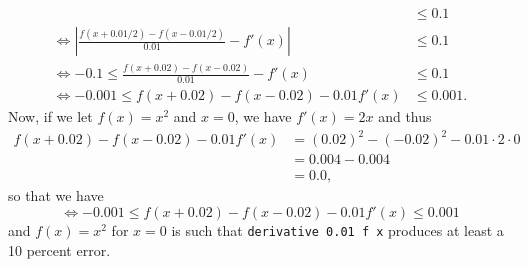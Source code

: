 \documentclass{article}
\begin{document}
\begin{itemize}
\begin{equation*}
\begin{split}
            &\leq 0.1 \\
            \Leftrightarrow \left| \frac{f(x + 0.01/2) - f(x - 0.01/2)}{0.01} - f'(x) \right| 
            &\leq 0.1 \\
            \Leftrightarrow -0.1 \leq \frac{f(x + 0.02) - f(x - 0.02)}{0.01} - f'(x) 
            &\leq 0.1 \\
            \Leftrightarrow -0.001 \leq f(x + 0.02) - f(x - 0.02) - 0.01f'(x) &\leq 0.001.
        \end{split}
    \end{equation*}
    \qquad Now, if we let $f(x) = x^2$ and $x = 0$, we have $f'(x) = 2x$ and thus
    \begin{equation*}
        \begin{split}
            f(x + 0.02) - f(x - 0.02) - 0.01f'(x)
            &= {(0.02)}^2 - (-0.02)^2 - 0.01\cdot2\cdot0 \\
            &= 0.004 - 0.004 \\
            &= 0.0,
        \end{split}
    \end{equation*}
    so that we have
    \[
        \Leftrightarrow -0.001 \leq f(x + 0.02) - f(x - 0.02) - 0.01f'(x) \leq 0.001
    \]
    and $f(x) = x^2$ for $x = 0$ is such that \verb|derivative 0.01 f x| produces at least a 
    10 percent error.
\end{itemize}
\end{document}
